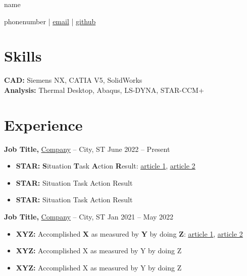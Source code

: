 \documentclass[11pt]{article}       %
\begin{document}
\centerline{\Huge {{name}}}

\vspace{5pt}

\centerline{
{{phonenumber}} | 
\href{mailto:name@gmail.com}{ {{email}}}  | 
\href{ {{"https://"+github}}}{ {{github}}}
}

\vspace{-10pt}

\section*{Skills}
\textbf{CAD:} Siemens NX, CATIA V5, SolidWorks \\
\textbf{Analysis:} Thermal Desktop, Abaqus, LS-DYNA, STAR-CCM+

\vspace{-6.5pt}

\section*{Experience}
\textbf{Job Title,} \href{https://www.fstl1992.com/}{Company} -- City, ST \hfill June 2022 -- Present \\
\vspace{-9pt}
\begin{itemize}
  \item \textbf{STAR:} \textbf{S}ituation \textbf{T}ask \textbf{A}ction \textbf{R}esult: \href{https://www.levels.fyi/blog/applying-star-method-resumes.html}{\underline{article 1}}, \href{https://resumegenius.com/blog/resume-help/star-method-resume}{\underline{article 2}}
  \item \textbf{STAR:} Situation Task Action Result
  \item \textbf{STAR:} Situation Task Action Result
\end{itemize}

\textbf{Job Title,} \href{https://www.fstl1992.com/}{Company} -- City, ST \hfill Jan 2021 -- May 2022 \\
\vspace{-9pt}
\begin{itemize}
  \item \textbf{XYZ:} Accomplished \textbf{X} as measured by \textbf{Y} by doing \textbf{Z}: \href{https://www.inc.com/bill-murphy-jr/google-recruiters-say-these-5-resume-tips-including-x-y-z-formula-will-improve-your-odds-of-getting-hired-at-google.html}{\underline{article 1}}, \href{https://elevenrecruiting.com/create-an-effective-resume-xyz-resume-format/}{\underline{article 2}}
  \item \textbf{XYZ:} Accomplished X as measured by Y by doing Z
  \item \textbf{XYZ:} Accomplished X as measured by Y by doing Z
\end{itemize}
\end{document}
